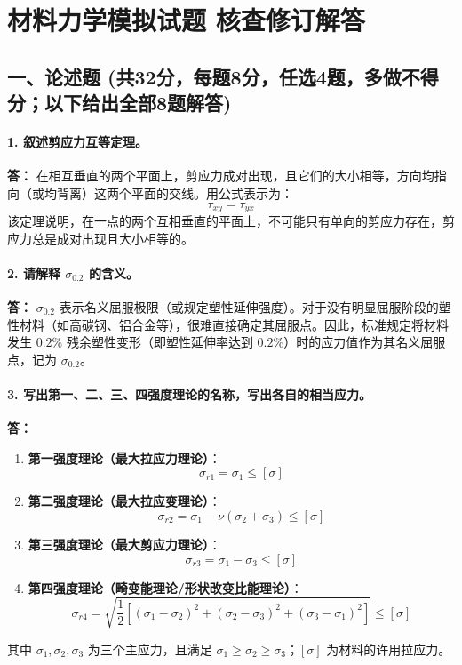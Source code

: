 \documentclass[11pt,a4paper]{ctexrep}
\begin{document}
\chapter{材料力学模拟试题 核查修订解答}
{



\section*{一、论述题 (共32分，每题8分，任选4题，多做不得分；以下给出全部8题解答)}

\subsubsection*{1. 叙述剪应力互等定理。}
\textbf{答：} 在相互垂直的两个平面上，剪应力成对出现，且它们的大小相等，方向均指向（或均背离）这两个平面的交线。用公式表示为：
\[
\tau_{xy} = \tau_{yx}
\]
该定理说明，在一点的两个互相垂直的平面上，不可能只有单向的剪应力存在，剪应力总是成对出现且大小相等的。

\subsubsection*{2. 请解释 $\sigma_{0.2}$ 的含义。}
\textbf{答：} $\sigma_{0.2}$ 表示名义屈服极限（或规定塑性延伸强度）。对于没有明显屈服阶段的塑性材料（如高碳钢、铝合金等），很难直接确定其屈服点。因此，标准规定将材料发生 $0.2\%$ 残余塑性变形（即塑性延伸率达到 $0.2\%$）时的应力值作为其名义屈服点，记为 $\sigma_{0.2}$。

\subsubsection*{3. 写出第一、二、三、四强度理论的名称，写出各自的相当应力。}
\textbf{答：}
\begin{enumerate}
    \item \textbf{第一强度理论（最大拉应力理论）}：
    \[
    \sigma_{r1} = \sigma_1 \le [\sigma]
    \]
    \item \textbf{第二强度理论（最大拉应变理论）}：
    \[
    \sigma_{r2} = \sigma_1 - \nu(\sigma_2 + \sigma_3) \le [\sigma]
    \]
    \item \textbf{第三强度理论（最大剪应力理论）}：
    \[
    \sigma_{r3} = \sigma_1 - \sigma_3 \le [\sigma]
    \]
    \item \textbf{第四强度理论（畸变能理论/形状改变比能理论）}：
    \[
    \sigma_{r4} = \sqrt{\frac{1}{2}\left[(\sigma_1 - \sigma_2)^2 + (\sigma_2 - \sigma_3)^2 + (\sigma_3 - \sigma_1)^2\right]} \le [\sigma]
    \]
\end{enumerate}
其中 $\sigma_1, \sigma_2, \sigma_3$ 为三个主应力，且满足 $\sigma_1 \ge \sigma_2 \ge \sigma_3$；$[\sigma]$ 为材料的许用拉应力。

}
\end{document}
